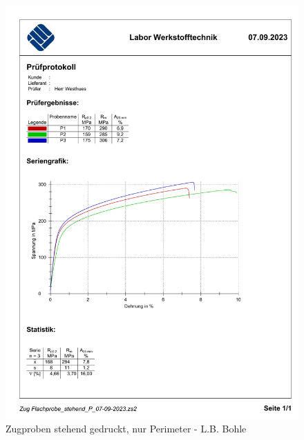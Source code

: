   \begin{figure}[ht]
    \centering
    \includegraphics[width=1\textwidth]{bilder/Zug Flachprobe_stehend_P.pdf}
    \caption{Zugproben stehend gedruckt, nur Perimeter - L.B. Bohle}
    \label{ZugprobenP}
  \end{figure}
  \FloatBarrier
  
